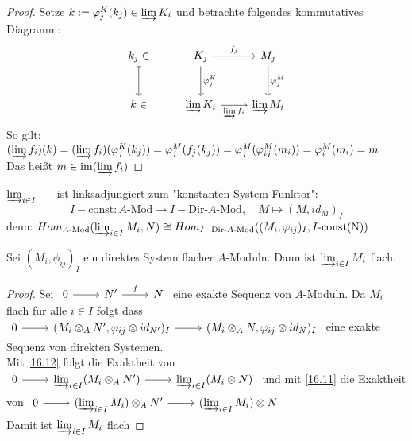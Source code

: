 \begin{proof}
	Setze $k:= \phi_j^K(k_j) \in \varinjlim K_i $ und betrachte folgendes kommutatives  Diagramm: \\
	$$\begin{tikzcd}[row sep = large]
	k_j \in \arrow[mapsto]{d} & K_j \arrow{r}{f_j} \arrow{d}{\phi_j^K} & M_j \arrow{d}{\phi_j^M} \\
	k \in & \varinjlim K_i \arrow[swap]{r}{\varinjlim f_i} & \varinjlim M_i
	\end{tikzcd}$$
	So gilt:\\
	 $(\varinjlim f_i)(k) = (\varinjlim f_i)(\phi_j^K(k_j)) = \phi_j^M(f_j(k_j)) =\phi_j^M(\phi_{ij}^M(m_i))=\phi_i^M(m_i)=m$ \\
	 Das heißt $ m \in \im(\varinjlim f_i) $
\end{proof}
\begin{anm}
	$\varinjlim_{i\in I} -$  \ ist linksadjungiert zum "konstanten System-Funktor": $$ I-\text{const}: A\text{-Mod} \to I-\text{Dir-}A\text{-Mod}, \quad M \mapsto (M,id_M)_I $$
	denn: $Hom_{A\text{-Mod}}(\varinjlim_{i\in I} M_i,N) \cong Hom_{I-\text{Dir-}A\text{-Mod}}((M_i,\phi_{ij})_I, I\text{-const(N)}) $
\end{anm}
\begin{fo} \label{16.13}
	Sei $ (M_i, \phi_{ij})_I $ ein direktes System flacher $A$-Moduln. Dann ist $\varinjlim_{i\in I} M_i $ flach. 
\end{fo}
\begin{proof}
	Sei  $\begin{tikzcd} 0 \arrow{r} & N' \arrow{r}{f} & N \end{tikzcd}$  eine exakte Sequenz von $A$-Moduln. Da $M_i$ flach für alle $i \in I $ folgt dass $\begin{tikzcd} 0 \arrow{r} & (M_i \otimes_A N',\phi_{ij}\otimes id_{N'})_I \arrow{r} & (M_i \otimes_A N, \phi_{ij} \otimes id_N)_I \end{tikzcd}$  eine exakte Sequenz von direkten Systemen.\\
	 Mit \ref{16.12} folgt die Exaktheit von $\begin{tikzcd} 0 \arrow{r} & \varinjlim_{i\in I}(M_i \otimes_A N')  \arrow{r} & \varinjlim_{i\in I}(M_i \otimes N) \end{tikzcd}$ und mit  \ref{16.11} die Exaktheit von  $\begin{tikzcd} 0 \arrow{r} & (\varinjlim_{i\in I}M_i) \otimes_A N' \arrow{r} & (\varinjlim_{i\in I}M_i) \otimes N \end{tikzcd}$ \\
	 Damit ist $ \varinjlim_{i\in I} M_i $ flach
\end{proof}

